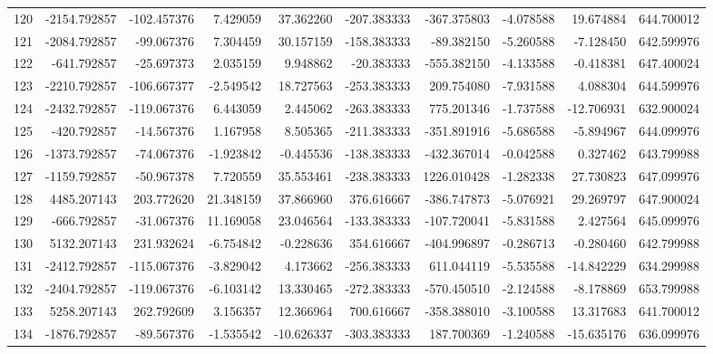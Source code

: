 \begin{tabular}{lrrrrrrrrr}
120 &  -2154.792857 &  -102.457376 &   7.429059 &  37.362260 &  -207.383333 &  -367.375803 &  -4.078588 &  19.674884 &  644.700012 \\
121 &  -2084.792857 &   -99.067376 &   7.304459 &  30.157159 &  -158.383333 &   -89.382150 &  -5.260588 &  -7.128450 &  642.599976 \\
122 &   -641.792857 &   -25.697373 &   2.035159 &   9.948862 &   -20.383333 &  -555.382150 &  -4.133588 &  -0.418381 &  647.400024 \\
123 &  -2210.792857 &  -106.667377 &  -2.549542 &  18.727563 &  -253.383333 &   209.754080 &  -7.931588 &   4.088304 &  644.599976 \\
124 &  -2432.792857 &  -119.067376 &   6.443059 &   2.445062 &  -263.383333 &   775.201346 &  -1.737588 & -12.706931 &  632.900024 \\
125 &   -420.792857 &   -14.567376 &   1.167958 &   8.505365 &  -211.383333 &  -351.891916 &  -5.686588 &  -5.894967 &  644.099976 \\
126 &  -1373.792857 &   -74.067376 &  -1.923842 &  -0.445536 &  -138.383333 &  -432.367014 &  -0.042588 &   0.327462 &  643.799988 \\
127 &  -1159.792857 &   -50.967378 &   7.720559 &  35.553461 &  -238.383333 &  1226.010428 &  -1.282338 &  27.730823 &  647.099976 \\
128 &   4485.207143 &   203.772620 &  21.348159 &  37.866960 &   376.616667 &  -386.747873 &  -5.076921 &  29.269797 &  647.900024 \\
129 &   -666.792857 &   -31.067376 &  11.169058 &  23.046564 &  -133.383333 &  -107.720041 &  -5.831588 &   2.427564 &  645.099976 \\
130 &   5132.207143 &   231.932624 &  -6.754842 &  -0.228636 &   354.616667 &  -404.996897 &  -0.286713 &  -0.280460 &  642.799988 \\
131 &  -2412.792857 &  -115.067376 &  -3.829042 &   4.173662 &  -256.383333 &   611.044119 &  -5.535588 & -14.842229 &  634.299988 \\
132 &  -2404.792857 &  -119.067376 &  -6.103142 &  13.330465 &  -272.383333 &  -570.450510 &  -2.124588 &  -8.178869 &  653.799988 \\
133 &   5258.207143 &   262.792609 &   3.156357 &  12.366964 &   700.616667 &  -358.388010 &  -3.100588 &  13.317683 &  641.700012 \\
134 &  -1876.792857 &   -89.567376 &  -1.535542 & -10.626337 &  -303.383333 &   187.700369 &  -1.240588 & -15.635176 &  636.099976 \\

\end{tabular}
